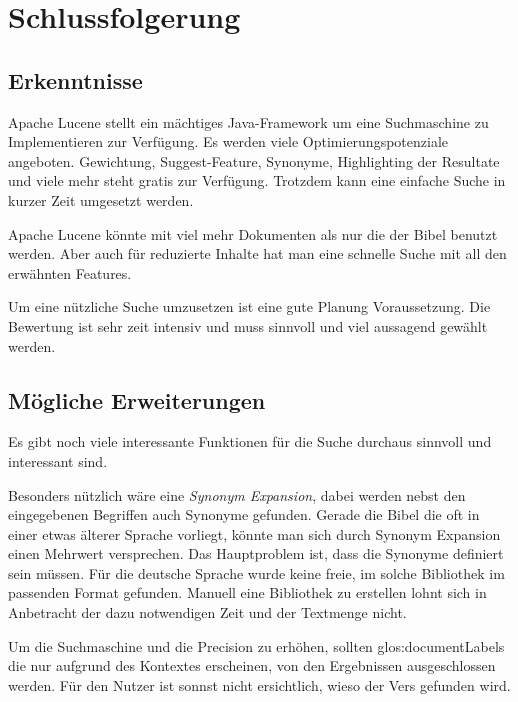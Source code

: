 \chapter{Schlussfolgerung}

\section{Erkenntnisse}
Apache Lucene stellt ein mächtiges Java-Framework um eine Suchmaschine zu Implementieren zur Verfügung.
Es werden viele Optimierungspotenziale angeboten. Gewichtung, Suggest-Feature, Synonyme, Highlighting der Resultate und viele mehr steht gratis zur Verfügung.
Trotzdem kann eine einfache Suche in kurzer Zeit umgesetzt werden.

Apache Lucene könnte mit viel mehr Dokumenten als nur die der Bibel benutzt werden. Aber auch für reduzierte Inhalte hat man eine schnelle Suche mit all den erwähnten Features.

Um eine nützliche Suche umzusetzen ist eine gute Planung Voraussetzung. Die Bewertung ist sehr zeit intensiv und muss sinnvoll und viel aussagend gewählt werden.

\section{Mögliche Erweiterungen}
Es gibt noch viele interessante Funktionen für die Suche durchaus sinnvoll und interessant sind.

Besonders nützlich wäre eine \textit{Synonym Expansion}, dabei werden nebst den eingegebenen Begriffen auch Synonyme gefunden. Gerade die Bibel die oft in einer etwas älterer Sprache vorliegt, könnte man sich durch Synonym Expansion einen Mehrwert versprechen.
Das Hauptproblem ist, dass die Synonyme definiert sein müssen. Für die deutsche Sprache wurde keine freie, im solche Bibliothek im passenden Format gefunden. Manuell eine Bibliothek zu erstellen lohnt sich in Anbetracht der dazu notwendigen Zeit und der Textmenge nicht.

Um die Suchmaschine und die Precision zu erhöhen, sollten \glspl{glos:documentLabel} die nur aufgrund des Kontextes erscheinen, von den Ergebnissen ausgeschlossen werden. Für den Nutzer ist sonnst nicht ersichtlich, wieso der Vers gefunden wird.

